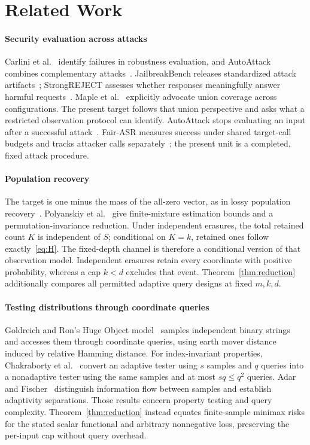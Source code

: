 \documentclass[conference]{IEEEtran}
\begin{document}
\section{Related Work}
\paragraph{Security evaluation across attacks}
Carlini et al.~\cite{carlini} identify failures in robustness evaluation, and AutoAttack combines complementary attacks~\cite{croce}. JailbreakBench releases standardized attack artifacts~\cite{jbb}; StrongREJECT assesses whether responses meaningfully answer harmful requests~\cite{strong}. Maple et al.~\cite{maple} explicitly advocate union coverage across configurations. The present target follows that union perspective and asks what a restricted observation protocol can identify. AutoAttack stops evaluating an input after a successful attack~\cite{autocode}. Fair-ASR measures success under shared target-call budgets and tracks attacker calls separately~\cite{fairasr}; the present unit is a completed, fixed attack procedure.

\paragraph{Population recovery}
The target is one minus the mass of the all-zero vector, as in lossy population recovery~\cite{moitra,polyanskiy}. Polyanskiy et al.~\cite[Theorem~4 and Remark~5]{polyanskiy} give finite-mixture estimation bounds and a permutation-invariance reduction. Under independent erasures, the total retained count $K$ is independent of $S$; conditional on $K=k$, retained ones follow exactly~\eqref{eq:H}. The fixed-depth channel is therefore a conditional version of that observation model. Independent erasures retain every coordinate with positive probability, whereas a cap $k<d$ excludes that event. Theorem~\ref{thm:reduction} additionally compares all permitted adaptive query designs at fixed $m,k,d$.

\paragraph{Testing distributions through coordinate queries}
Goldreich and Ron's Huge Object model~\cite{hugeobjects} samples independent binary strings and accesses them through coordinate queries, using earth mover distance induced by relative Hamming distance. For index-invariant properties, Chakraborty et al.~\cite[Theorem~F.1]{indexinvariant} convert an adaptive tester using $s$ samples and $q$ queries into a nonadaptive tester using the same samples and at most $sq\leq q^2$ queries. Adar and Fischer~\cite{adaptivity} distinguish information flow between samples and establish adaptivity separations. Those results concern property testing and query complexity. Theorem~\ref{thm:reduction} instead equates finite-sample minimax risks for the stated scalar functional and arbitrary nonnegative loss, preserving the per-input cap without query overhead.
\end{document}
